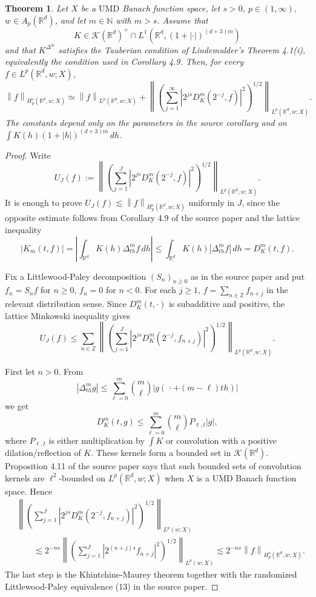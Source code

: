 \documentclass[11pt]{article}
\newtheorem{theorem}{Theorem}
\newcommand{\R}{\mathbb{R}}
\newcommand{\N}{\mathbb{N}}
\newcommand{\Z}{\mathbb{Z}}
\newcommand{\cK}{\mathscr{K}}
\newcommand{\norm}[1]{\left\lVert #1 \right\rVert}
\newcommand{\abs}[1]{\left\lvert #1 \right\rvert}
\newcommand{\UMD}{\mathrm{UMD}}
\newcommand{\lesssimC}{\lesssim}
\begin{document}
\begin{theorem}
Let \(X\) be a \(\UMD\) Banach function space, let \(s>0\),
\(p\in(1,\infty)\), \(w\in A_p(\R^d)\), and let \(m\in\N\) with \(m>s\).
Assume that
\[
  K\in \cK(\R^d)^+\cap L^1(\R^d,(1+\abs{\cdot})^{(d+3)m})
\]
and that \(K^{\Delta^m}\) satisfies the Tauberian condition of
Lindemulder's Theorem 4.1(i), equivalently the condition used in Corollary
4.9.  Then, for every \(f\in L^p(\R^d,w;X)\),
\[
\norm{f}_{H^s_p(\R^d,w;X)}
\simeq
\norm{f}_{L^p(\R^d,w;X)}
+
\norm{
  \left(\sum_{j=1}^{\infty}
    \abs{2^{js}D^m_K(2^{-j},f)}^2
  \right)^{1/2}
}_{L^p(\R^d,w;X)}.
\]
The constants depend only on the parameters in the source corollary and on
\(\int K(h)(1+\abs h)^{(d+3)m}\,dh\).
\end{theorem}

\begin{proof}
Write
\[
  U_J(f):=
  \norm{
    \left(\sum_{j=1}^{J}
      \abs{2^{js}D^m_K(2^{-j},f)}^2
    \right)^{1/2}
  }_{L^p(\R^d,w;X)}.
\]
It is enough to prove \(U_J(f)\lesssimC \norm{f}_{H^s_p(\R^d,w;X)}\)
uniformly in \(J\), since the opposite estimate follows from Corollary 4.9 of
the source paper and the lattice inequality
\[
  \abs{K_m(t,f)}=
  \abs{\int_{\R^d}K(h)\Delta^m_{t h}f\,dh}
  \le
  \int_{\R^d}K(h)\abs{\Delta^m_{t h}f}\,dh
  =D^m_K(t,f).
\]

Fix a Littlewood-Paley decomposition \((S_n)_{n\ge 0}\) as in the source
paper and put \(f_n=S_nf\) for \(n\ge0\), \(f_n=0\) for \(n<0\).  For each
\(j\ge1\), \(f=\sum_{n\in\Z}f_{n+j}\) in the relevant distribution sense.
Since \(D^m_K(t,\cdot)\) is subadditive and positive, the lattice Minkowski
inequality gives
\[
  U_J(f)
  \le
  \sum_{n\in\Z}
  \norm{
    \left(\sum_{j=1}^{J}
      \abs{2^{js}D^m_K(2^{-j},f_{n+j})}^2
    \right)^{1/2}
  }_{L^p(\R^d,w;X)}.
\]

First let \(n>0\).  From
\[
  \abs{\Delta^m_{t h}g}
  \le
  \sum_{\ell=0}^{m}{m\choose \ell}\abs{g(\,\cdot +(m-\ell)t h)}
\]
we get
\[
  D^m_K(t,g)
  \le
  \sum_{\ell=0}^{m} {m\choose \ell} P_{\ell,t}\abs g,
\]
where \(P_{\ell,t}\) is either multiplication by \(\int K\) or convolution
with a positive dilation/reflection of \(K\).  These kernels form a bounded
set in \(\cK(\R^d)\).  Proposition 4.11 of the source paper says that such
bounded sets of convolution kernels are \(\ell^2\)-bounded on
\(L^p(\R^d,w;X)\) when \(X\) is a \(\UMD\) Banach function space.  Hence
\[
\begin{aligned}
&\norm{
    \left(\sum_{j=1}^{J}
      \abs{2^{js}D^m_K(2^{-j},f_{n+j})}^2
    \right)^{1/2}
  }_{L^p(w;X)}
\\
&\qquad\lesssim
 2^{-ns}
 \norm{
    \left(\sum_{j=1}^{J}
      \abs{2^{(n+j)s}f_{n+j}}^2
    \right)^{1/2}
  }_{L^p(w;X)}
 \lesssim
 2^{-ns}\norm{f}_{H^s_p(\R^d,w;X)}.
\end{aligned}
\]
The last step is the Khintchine-Maurey theorem together with the randomized
Littlewood-Paley equivalence (13) in the source paper.


\end{proof}
\end{document}

